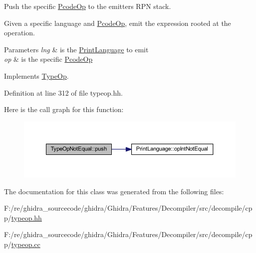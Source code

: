 Push the specific \mbox{\hyperlink{class_pcode_op}{Pcode\+Op}} to the emitter\textquotesingle{}s R\+PN stack. 

Given a specific language and \mbox{\hyperlink{class_pcode_op}{Pcode\+Op}}, emit the expression rooted at the operation. 
\begin{DoxyParams}{Parameters}
{\em lng} & is the \mbox{\hyperlink{class_print_language}{Print\+Language}} to emit \\
\hline
{\em op} & is the specific \mbox{\hyperlink{class_pcode_op}{Pcode\+Op}} \\
\hline
\end{DoxyParams}


Implements \mbox{\hyperlink{class_type_op_ac9c9544203ed74dabe6ac662b653b2af}{Type\+Op}}.



Definition at line 312 of file typeop.\+hh.

Here is the call graph for this function\+:
\nopagebreak
\begin{figure}[H]
\begin{center}
\leavevmode
\includegraphics[width=350pt]{class_type_op_not_equal_a27576ad1c689ccde9d210583d3f1c8ea_cgraph}
\end{center}
\end{figure}


The documentation for this class was generated from the following files\+:\begin{DoxyCompactItemize}
\item 
F\+:/re/ghidra\+\_\+sourcecode/ghidra/\+Ghidra/\+Features/\+Decompiler/src/decompile/cpp/\mbox{\hyperlink{typeop_8hh}{typeop.\+hh}}\item 
F\+:/re/ghidra\+\_\+sourcecode/ghidra/\+Ghidra/\+Features/\+Decompiler/src/decompile/cpp/\mbox{\hyperlink{typeop_8cc}{typeop.\+cc}}\end{DoxyCompactItemize}
